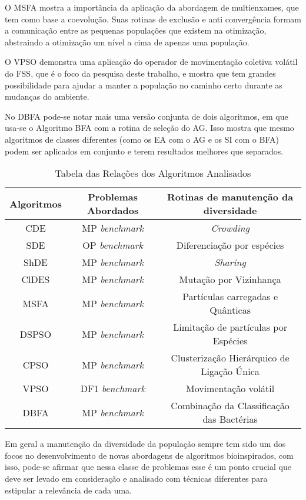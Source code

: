 O MSFA mostra a importância da aplicação da abordagem de multienxames, que tem como base a coevolução. Suas rotinas de exclusão e anti convergência formam a comunicação entre as pequenas populações que existem na otimização, abstraindo a otimização um nível a cima de apenas uma população.

O VPSO demonstra uma aplicação do operador de movimentação coletiva volátil do FSS, que é o foco da pesquisa deste trabalho, e mostra que tem grandes possibilidade para ajudar a manter a população no caminho certo durante as mudanças do ambiente.

No DBFA pode-se notar mais uma versão conjunta de dois algoritmos, em que usa-se o Algoritmo BFA com a rotina de seleção do AG. Isso mostra que mesmo algoritmos de classes diferentes (como os EA com o AG e os SI com o BFA) podem ser aplicados em conjunto e terem resultados melhores que separados.

\begin{table}[]
	\label{tab:problems_table}
	\centering
	\caption{Tabela das Relações dos Algoritmos Analisados}
	\label{my-label}
	\begin{tabular}{|c|c|c|}
		\hline
		Algoritmos & Problemas Abordados & Rotinas de manutenção da diversidade \\ \hline
		CDE        & MP \textit{benchmark}   & \textit{Crowding} \\ \hline
		SDE        & OP \textit{benchmark}   & Diferenciação por espécies \\ \hline
		ShDE       & MP \textit{benchmark}   & \textit{Sharing} \\ \hline
		ClDES      & MP \textit{benchmark}   & Mutação por Vizinhança \\ \hline
		MSFA       & MP \textit{benchmark}   & Partículas carregadas e Quânticas \\ \hline
		DSPSO      & MP \textit{benchmark}   & Limitação de partículas por Espécies \\ \hline
		CPSO       & MP \textit{benchmark}   & Clusterização Hierárquico de Ligação Única \\ \hline
		VPSO       & DF1 \textit{benchmark}  & Movimentação volátil \\ \hline
		DBFA       & MP \textit{benchmark}   & Combinação da Classificação das Bactérias \\ \hline
	\end{tabular}
\end{table}

Em geral a manutenção da diversidade da população sempre tem sido um dos focos no desenvolvimento de novas abordagens de algoritmos bioinspirados, com isso, pode-se afirmar que nessa classe de problemas esse é um ponto crucial que deve ser levado em consideração e analisado com técnicas diferentes para estipular a relevância de cada uma.